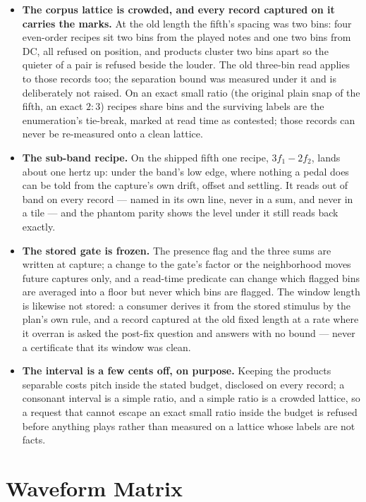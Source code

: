 \documentclass[11pt,a4paper]{article}
\begin{document}
{\begin{itemize}
  \item \textbf{The corpus lattice is crowded, and every record captured
  on it carries the marks.} At the old length the fifth's spacing was two
  bins: four even-order recipes sit two bins from the played notes and one
  two bins from DC, all refused on position, and products cluster two bins
  apart so the quieter of a pair is refused beside the louder. The old
  three-bin read applies to those records too; the separation bound was
  measured under it and is deliberately not raised. On an exact small
  ratio (the original plain snap of the fifth, an exact $2 : 3$) recipes
  share bins and the surviving labels are the enumeration's tie-break,
  marked at read time as contested; those records can never be
  re-measured onto a clean lattice.
  \item \textbf{The sub-band recipe.} On the shipped fifth one recipe,
  $3f_1 - 2f_2$, lands about one hertz up: under the band's low edge,
  where nothing a pedal does can be told from the capture's own drift,
  offset and settling. It reads out of band on every record --- named in
  its own line, never in a sum, and never in a tile --- and the phantom
  parity shows the level under it still reads back exactly.
  \item \textbf{The stored gate is frozen.} The presence flag and the
  three sums are written at capture; a change to the gate's factor or the
  neighborhood moves future captures only, and a read-time predicate can
  change which flagged bins are averaged into a floor but never which
  bins are flagged. The window length is likewise not stored: a consumer
  derives it from the stored stimulus by the plan's own rule, and a
  record captured at the old fixed length at a rate where it overran is
  asked the post-fix question and answers with no bound --- never a
  certificate that its window was clean.
  \item \textbf{The interval is a few cents off, on purpose.} Keeping the
  products separable costs pitch inside the stated budget, disclosed on
  every record; a consonant interval is a simple ratio, and a simple ratio
  is a crowded lattice, so a request that cannot escape an exact small
  ratio inside the budget is refused before anything plays rather than
  measured on a lattice whose labels are not facts.
\end{itemize}
\par}

\clearpage
\section{Waveform Matrix}
\label{sec:matrix}


\end{document}
